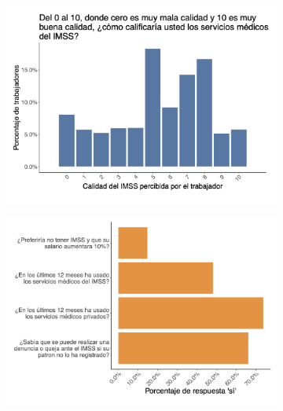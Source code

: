 \documentclass[oneside,11pt]{article}
\begin{document}
\begin{figure}[H]
\begin{center}
    \begin{subfigure}{0.49\textwidth}
    \includegraphics[width=\textwidth]{04_Figures/worker_survey/Exp_15.png}
    \end{subfigure}
    \begin{subfigure}{0.49\textwidth}
    \includegraphics[width=\textwidth]{04_Figures/worker_survey/Exp_16.png}
    \end{subfigure}
    
    \end{center}
\end{figure}



\newpage

\end{document}
